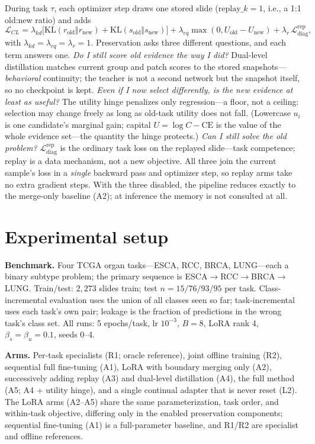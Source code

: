 \documentclass{article}
\begin{document}
During task $\tau$, each optimizer step draws one stored slide ($\mathrm{replay}\_k{=}1$, i.e., a 1:1 old:new ratio) and adds
\begin{equation}
\mathcal{L}_{CL} = \lambda_{kd}\big[\mathrm{KL}(r_{\mathrm{old}}\Vert r_{\mathrm{new}}) + \mathrm{KL}(s_{\mathrm{old}}\Vert s_{\mathrm{new}})\big] + \lambda_{eq}\max(0, U_{\mathrm{old}} - U_{\mathrm{new}}) + \lambda_{r}\,\mathcal{L}_{\mathrm{diag}}^{\mathrm{rep}},
\end{equation}
with $\lambda_{kd}{=}\lambda_{eq}{=}\lambda_{r}{=}1$. Preservation asks three different questions, and each term answers one. \emph{Do I still score old evidence the way I did?} Dual-level distillation matches current group and patch scores to the stored snapshots---\emph{behavioral} continuity; the teacher is not a second network but the snapshot itself, so no checkpoint is kept. \emph{Even if I now select differently, is the new evidence at least as useful?} The utility hinge penalizes only regression---a floor, not a ceiling: selection may change freely as long as old-task utility does not fall. (Lowercase $u_i$ is one candidate's marginal gain; capital $U = \log C - \mathrm{CE}$ is the value of the whole evidence set---the quantity the hinge protects.) \emph{Can I still solve the old problem?} $\mathcal{L}_{\mathrm{diag}}^{\mathrm{rep}}$ is the ordinary task loss on the replayed slide---task competence; replay is a data mechanism, not a new objective. All three join the current sample's loss in a \emph{single} backward pass and optimizer step, so replay arms take no extra gradient steps. With the three disabled, the pipeline reduces exactly to the merge-only baseline (A2); at inference the memory is not consulted at all.

\section{Experimental setup}
\label{sec:setup}
\textbf{Benchmark.} Four TCGA organ tasks---ESCA, RCC, BRCA, LUNG---each a binary subtype problem; the primary sequence is ESCA${\to}$RCC${\to}$BRCA${\to}$LUNG. Train/test: $2{,}273$ slides train; test $n=15/76/93/95$ per task. Class-incremental evaluation uses the union of all classes seen so far; task-incremental uses each task's own pair; leakage is the fraction of predictions in the wrong task's class set. All runs: 5 epochs/task, lr $10^{-3}$, $B{=}8$, LoRA rank 4, $\beta_s{=}\beta_u{=}0.1$, seeds 0--4.

\textbf{Arms.} Per-task specialists (R1; oracle reference), joint offline training (R2), sequential full fine-tuning (A1), LoRA with boundary merging only (A2), successively adding replay (A3) and dual-level distillation (A4), the full method (A5; A4 + utility hinge), and a single continual adapter that is never reset (L2). The LoRA arms (A2--A5) share the same parameterization, task order, and within-task objective, differing only in the enabled preservation components; sequential fine-tuning (A1) is a full-parameter baseline, and R1/R2 are specialist and offline references.
\end{document}
